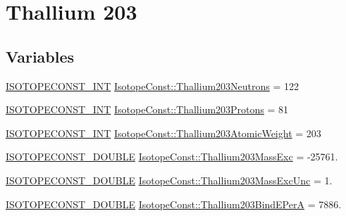\hypertarget{group___isotope_const-_thallium-_tl203}{}\section{Thallium 203}
\label{group___isotope_const-_thallium-_tl203}
\subsection*{Variables}
\begin{DoxyCompactItemize}
\item 
\mbox{\hyperlink{group___isotope_const-_macros_ga5f18360b3e99483a35c32d789e62621c}{I\+S\+O\+T\+O\+P\+E\+C\+O\+N\+S\+T\+\_\+\+I\+NT}} \mbox{\hyperlink{group___isotope_const-_thallium-_tl203_gaac0c28a99ed0772ca7ecfb454ee172ff}{Isotope\+Const\+::\+Thallium203\+Neutrons}} = 122
\item 
\mbox{\hyperlink{group___isotope_const-_macros_ga5f18360b3e99483a35c32d789e62621c}{I\+S\+O\+T\+O\+P\+E\+C\+O\+N\+S\+T\+\_\+\+I\+NT}} \mbox{\hyperlink{group___isotope_const-_thallium-_tl203_gae77d437e715e967bf05d30eed205eda8}{Isotope\+Const\+::\+Thallium203\+Protons}} = 81
\item 
\mbox{\hyperlink{group___isotope_const-_macros_ga5f18360b3e99483a35c32d789e62621c}{I\+S\+O\+T\+O\+P\+E\+C\+O\+N\+S\+T\+\_\+\+I\+NT}} \mbox{\hyperlink{group___isotope_const-_thallium-_tl203_ga0f07529f796777ba8b3f31da2cbfef01}{Isotope\+Const\+::\+Thallium203\+Atomic\+Weight}} = 203
\item 
\mbox{\hyperlink{group___isotope_const-_macros_ga8f45a7272ce02c0b4c65c44636ed719a}{I\+S\+O\+T\+O\+P\+E\+C\+O\+N\+S\+T\+\_\+\+D\+O\+U\+B\+LE}} \mbox{\hyperlink{group___isotope_const-_thallium-_tl203_gac053cbbdc702c026efa1816780618590}{Isotope\+Const\+::\+Thallium203\+Mass\+Exc}} = -\/25761.
\item 
\mbox{\hyperlink{group___isotope_const-_macros_ga8f45a7272ce02c0b4c65c44636ed719a}{I\+S\+O\+T\+O\+P\+E\+C\+O\+N\+S\+T\+\_\+\+D\+O\+U\+B\+LE}} \mbox{\hyperlink{group___isotope_const-_thallium-_tl203_gab43a740296b9b912b822f95210e0192b}{Isotope\+Const\+::\+Thallium203\+Mass\+Exc\+Unc}} = 1.
\item 
\mbox{\hyperlink{group___isotope_const-_macros_ga8f45a7272ce02c0b4c65c44636ed719a}{I\+S\+O\+T\+O\+P\+E\+C\+O\+N\+S\+T\+\_\+\+D\+O\+U\+B\+LE}} \mbox{\hyperlink{group___isotope_const-_thallium-_tl203_gabd17f71c4c5bc7045bd73fb483693260}{Isotope\+Const\+::\+Thallium203\+Bind\+E\+PerA}} = 7886.
\item 

\end{DoxyCompactItemize}

